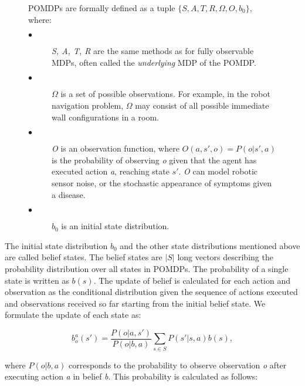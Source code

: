 \begin{figure}[h]
\begin{definition}\label{def:POMDP}
POMDPs \cite{Shani2013} are formally defined as a tuple $\{S, A, T, R, \Omega, O, b_0\}$, where:
\begin{description}
  \item[$\bullet$ ] \textit{S, A, T, R} are the same methods as for fully observable MDPs, often called the \textit{underlying} MDP of the POMDP.
  \item[$\bullet$ ] $\Omega$ is a set of possible observations. For example, in the robot navigation problem, $\Omega$ may consist of all possible immediate wall configurations in a room.
  \item[$\bullet$ ] \textit{O} is an observation function, where $O(a, s', o) = P(o|s', a)$ is the probability of observing \textit{o} given that the agent has executed action \textit{a}, reaching state \textit{$s'$}. \textit{O} can model
robotic sensor noise, or the stochastic appearance of symptoms given a disease.
  \item[$\bullet$ ] $b_0$ is an initial state distribution.
\end{description}

\end{definition}
\end{figure}


The initial state distribution $b_0$ and the other state distributions mentioned above are called belief states. The belief states are $|S|$ long vectors describing the probability distribution over all states in POMDPs. The probability of a single state is written as $b(s)$. The update of belief is calculated for each action and observation as the conditional distribution given the sequence of actions executed and observations received so far starting from the initial belief state. We formulate the update of each state as:

\begin{equation} \label{eq:bao} b_o^a(s') = \dfrac{P(o|a, s')}{P(o|b, a)} \sum_{s \in S} P(s'|s, a) b(s),\end{equation}

where $P(o|b, a)$ corresponds to the probability to observe observation \textit{o} after executing action \textit{a} in belief \textit{b}. This probability is calculated as follows:

